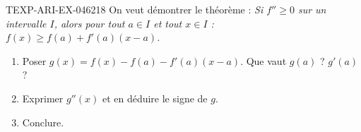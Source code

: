 \begin{exercice}{TEXP-ARI-EX-046}{2}{18}
On veut démontrer le théorème : \emph{Si $f'' \geq 0$ sur un intervalle $I$, alors pour tout $a \in I$ et tout $x \in I$ : $f(x) \geq f(a) + f'(a)(x - a)$.}
\begin{enumerate}
  \item Poser $g(x) = f(x) - f(a) - f'(a)(x-a)$. Que vaut $g(a)$ ? $g'(a)$ ?
  \item Exprimer $g''(x)$ et en déduire le signe de $g$.
  \item Conclure.
\end{enumerate}

\end{exercice}

